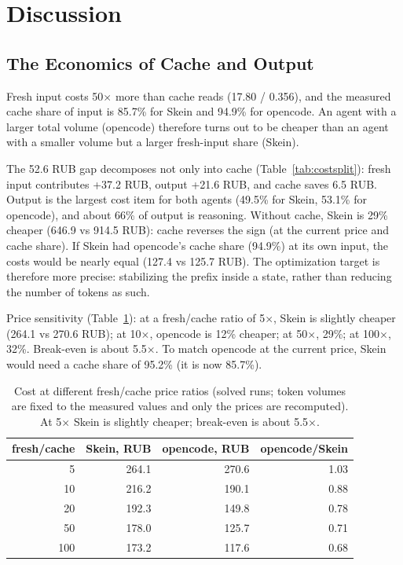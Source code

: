 \documentclass[11pt,a4paper]{article}
\begin{document}
\section{Discussion}
\label{sec:discussion}

\subsection{The Economics of Cache and Output}

Fresh input costs 50$\times$ more than cache reads (17.80 / 0.356), and the
measured cache share of input is 85.7\% for Skein and 94.9\% for opencode. An agent with a larger
total volume (opencode) therefore turns out to be cheaper than an agent with a smaller volume
but a larger fresh-input share (Skein).

The 52.6 RUB gap decomposes not only into cache (Table~\ref{tab:costsplit}): fresh input
contributes +37.2 RUB, output +21.6 RUB, and cache saves 6.5 RUB. Output is the largest cost
item for both agents (49.5\% for Skein, 53.1\% for opencode), and about 66\% of output is
reasoning. Without cache, Skein is 29\% cheaper (646.9 vs 914.5 RUB): cache reverses the sign (at
the current price and cache share). If Skein had opencode's cache share (94.9\%) at its own
input, the costs would be nearly equal (127.4 vs 125.7 RUB). The optimization target is
therefore more precise: stabilizing the prefix inside a state, rather than reducing the number
of tokens as such.

Price sensitivity (Table~\ref{tab:sensitivity}): at a fresh/cache ratio of 5$\times$, Skein is
slightly cheaper (264.1 vs 270.6 RUB); at 10$\times$, opencode is 12\% cheaper; at 50$\times$,
29\%; at 100$\times$, 32\%. Break-even is about 5.5$\times$. To match opencode at the current
price, Skein would need a cache share of 95.2\% (it is now 85.7\%).

\begin{table}[t]
\centering
\small
\caption{Cost at different fresh/cache price ratios (solved runs; token volumes are fixed to the
measured values and only the prices are recomputed). At 5$\times$ Skein is slightly cheaper;
break-even is about 5.5$\times$.}
\label{tab:sensitivity}
\begin{tabular}{@{}rrrr@{}}
\toprule
fresh/cache & Skein, RUB & opencode, RUB & opencode/Skein \\
\midrule
5   & 264.1 & 270.6 & 1.03 \\
10  & 216.2 & 190.1 & 0.88 \\
20  & 192.3 & 149.8 & 0.78 \\
50  & 178.0 & 125.7 & 0.71 \\
100 & 173.2 & 117.6 & 0.68 \\
\bottomrule
\end{tabular}
\end{table}
\end{document}
